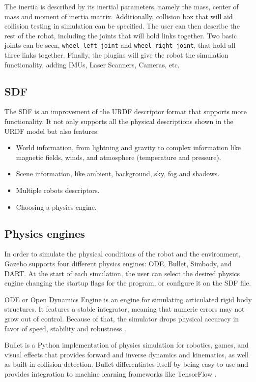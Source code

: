 The inertia is described by its inertial parameters, namely the mass, center of mass and moment of inertia matrix. Additionally, collision box that will aid collision testing in simulation can be specified. The user can then describe the rest of the robot, including the joints that will hold links together. Two basic joints can be seen, \texttt{wheel\_left\_joint} and \texttt{wheel\_right\_joint}, that hold all three links together. Finally, the plugins will give the robot the simulation functionality, adding IMUs, Laser Scanners, Cameras, etc.

\subsection{SDF}

The SDF is an improvement of the URDF descriptor format that supports more functionality. It not only supports all the physical descriptions shown in the URDF model but also features:

\begin{itemize}
\item World information, from lightning and gravity to complex information like magnetic fields, winds, and atmosphere (temperature and pressure).
\item Scene information, like ambient, background, sky, fog and shadows.
\item Multiple robots descriptors.
\item Choosing a physics engine.
\end{itemize}

\subsection{Physics engines}

In order to simulate the physical conditions of the robot and the environment, Gazebo supports four different physics engines: ODE, Bullet, Simbody, and DART. At the start of each simulation, the user can select the desired physics engine changing the startup flags for the program, or configure it on the SDF file.

ODE or Open Dynamics Engine is an engine for simulating articulated rigid body structures. It features a stable integrator, meaning that numeric errors may not grow out of control. Because of that, the simulator drops physical accuracy in favor of speed, stability and robustness \cite{smith2005open}.

Bullet is a Python implementation of physics simulation for robotics, games, and visual effects that provides forward and inverse dynamics and kinematics, as well as built-in collision detection. Bullet differentiates itself by being easy to use and provides integration to machine learning frameworks like TensorFlow \cite{coumans2018}.

